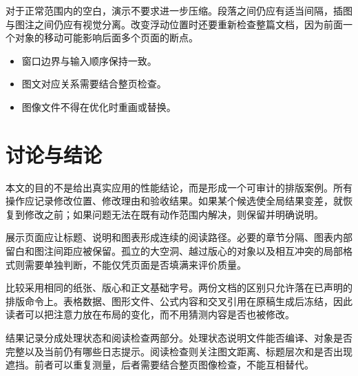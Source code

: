 \documentclass[UTF8,10pt,a4paper,fontset=windows,twocolumn]{ctexart}
\begin{document}
对于正常范围内的空白，演示不要求进一步压缩。段落之间仍应有适当间隔，插图与图注之间仍应有视觉分离。改变浮动位置时还要重新检查整篇文档，因为前面一个对象的移动可能影响后面多个页面的断点。

\begin{itemize}[itemsep=18pt,topsep=18pt]
\item 窗口边界与输入顺序保持一致。
\item 图文对应关系需要结合整页检查。
\item 图像文件不得在优化时重画或替换。
\end{itemize}
\section{讨论与结论}
本文的目的不是给出真实应用的性能结论，而是形成一个可审计的排版案例。所有操作应记录修改位置、修改理由和验收结果。如果某个候选使全局结果变差，就恢复到修改之前；如果问题无法在既有动作范围内解决，则保留并明确说明。

展示页面应让标题、说明和图表形成连续的阅读路径。必要的章节分隔、图表内部留白和图注间距应被保留。孤立的大空洞、越过版心的对象以及相互冲突的局部格式则需要单独判断，不能仅凭页面是否填满来评价质量。

比较采用相同的纸张、版心和正文基础字号。两份文档的区别只允许落在已声明的排版命令上。表格数据、图形文件、公式内容和交叉引用在原稿生成后冻结，因此读者可以把注意力放在布局的变化，而不用猜测内容是否也被修改。

结果记录分成处理状态和阅读检查两部分。处理状态说明文件能否编译、对象是否完整以及当前仍有哪些日志提示。阅读检查则关注图文距离、标题层次和是否出现遮挡。前者可以重复测量，后者需要结合整页图像检查，不能互相替代。
\end{document}
